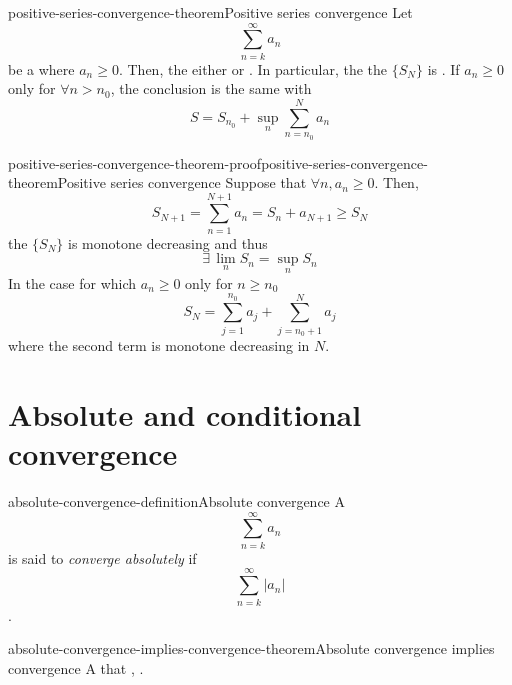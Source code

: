 \documentclass[preview]{standalone}
\begin{document}
\begin{snippettheorem}{positive-series-convergence-theorem}{Positive series convergence}
    Let \[ \sum_{n=k}^\infty a_n \]
    be a \series where \(a_n \geq 0\). Then, the \series either \seriesdiverges
    or \seriesconverges. In particular, the \series \seriesconverges \ifandonlyif the \partialsum
    \sequence \(\{S_N\}\) is .
    If \(a_n \geq 0\) only \eventually for \(\forall n>n_0\),
    the conclusion is the same with
    \[
        S = S_{n_0} + \sup_n
        \sum_{n=n_0}^N a_n
    \]
\end{snippettheorem}


\begin{snippetproof}{positive-series-convergence-theorem-proof}{positive-series-convergence-theorem}{Positive series convergence}
    Suppose that \(\forall n, a_n \geq 0\). Then,
    \[
        S_{N+1} = \sum_{n=1}^{N+1} a_n = S_n + a_{N+1} \geq S_N
    \]
    the \sequence \(\{S_N\}\) is monotone decreasing and thus %
    \[ \exists\, \lim_n S_n = \sup_n S_n \]
    In the case for which \(a_n \geq 0\) only for \(n\geq n_0\)
    \[ S_N = \sum_{j=1}^{n_0} a_j + \sum_{j=n_0 + 1}^N a_j \]
    where the second term is monotone decreasing in \(N\).
\end{snippetproof}

\section{Absolute and conditional convergence}

\begin{snippetdefinition}{absolute-convergence-definition}{Absolute convergence}
    A \series \[\sum_{n=k}^\infty a_n\] is said to \emph{converge absolutely} if
    \[\sum_{n=k}^\infty |a_n|\] \seriesconverges.
\end{snippetdefinition}


\begin{snippettheorem}{absolute-convergence-implies-convergence-theorem}{Absolute convergence implies convergence}
    A \series that \convergesabsolutely, \seriesconverges.
\end{snippettheorem}
\end{document}
